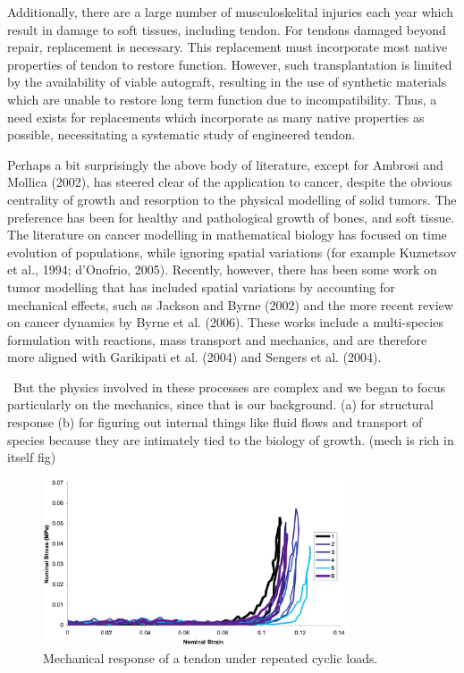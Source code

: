 Additionally, there are a large number of musculoskelital injuries
each year which result in damage to soft tissues, including
tendon. For tendons damaged beyond repair, replacement is
necessary. This replacement must incorporate most native properties of
tendon to restore function. However, such transplantation is limited
by the availability of viable autograft, resulting in the use of
synthetic materials which are unable to restore long term function due
to incompatibility. Thus, a need exists for replacements which
incorporate as many native properties as possible, necessitating a
systematic study of engineered tendon.

Perhaps a bit surprisingly the above body of literature, except for
Ambrosi and Mollica (2002), has steered clear of the application to
cancer, despite the obvious centrality of growth and resorption to the
physical modelling of solid tumors. The preference has been for
healthy and pathological growth of bones, and soft tissue. The
literature on cancer modelling in mathematical biology has focused on
time evolution of populations, while ignoring spatial variations (for
example Kuznetsov et al., 1994; d'Onofrio, 2005). Recently, however,
there has been some work on tumor modelling that has included spatial
variations by accounting for mechanical effects, such as Jackson and
Byrne (2002) and the more recent review on cancer dynamics by Byrne et
al. (2006). These works include a multi-species formulation with
reactions, mass transport and mechanics, and are therefore more
aligned with Garikipati et al. (2004) and Sengers et al. (2004).

\textbullet\ But the physics involved in these processes are complex and we began
to focus particularly on the mechanics, since that is our
background. (a) for structural response (b) for figuring out internal
things like fluid flows and transport of species because they are
intimately tied to the biology of growth. (mech is rich in itself fig)

\begin{figure}[!hpt]
\centering
\includegraphics[width=0.8\textwidth]
                {images/experiments/tendon-cyclic-load} 
\caption{Mechanical response of a tendon under repeated cyclic loads.}
\label{tendon-cyclic-load}
\end{figure}

